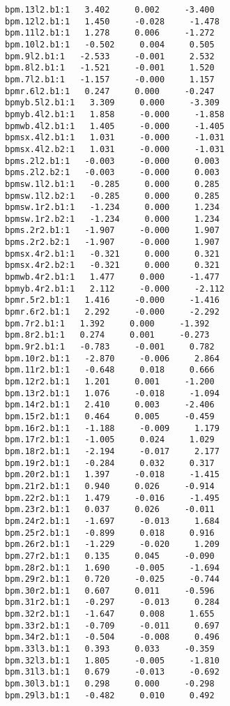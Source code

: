 \begin{verbatim}
bpm.13l2.b1:1   3.402     0.002     -3.400
bpm.12l2.b1:1   1.450     -0.028     -1.478
bpm.11l2.b1:1   1.278     0.006     -1.272
bpm.10l2.b1:1   -0.502     0.004     0.505
bpm.9l2.b1:1   -2.533     -0.001     2.532
bpm.8l2.b1:1   -1.521     -0.001     1.520
bpm.7l2.b1:1   -1.157     -0.000     1.157
bpmr.6l2.b1:1   0.247     0.000     -0.247
bpmyb.5l2.b1:1   3.309     0.000     -3.309
bpmyb.4l2.b1:1   1.858     -0.000     -1.858
bpmwb.4l2.b1:1   1.405     -0.000     -1.405
bpmsx.4l2.b1:1   1.031     -0.000     -1.031
bpmsx.4l2.b2:1   1.031     -0.000     -1.031
bpms.2l2.b1:1   -0.003     -0.000     0.003
bpms.2l2.b2:1   -0.003     -0.000     0.003
bpmsw.1l2.b1:1   -0.285     0.000     0.285
bpmsw.1l2.b2:1   -0.285     0.000     0.285
bpmsw.1r2.b1:1   -1.234     0.000     1.234
bpmsw.1r2.b2:1   -1.234     0.000     1.234
bpms.2r2.b1:1   -1.907     -0.000     1.907
bpms.2r2.b2:1   -1.907     -0.000     1.907
bpmsx.4r2.b1:1   -0.321     0.000     0.321
bpmsx.4r2.b2:1   -0.321     0.000     0.321
bpmwb.4r2.b1:1   1.477     0.000     -1.477
bpmyb.4r2.b1:1   2.112     -0.000     -2.112
bpmr.5r2.b1:1   1.416     -0.000     -1.416
bpmr.6r2.b1:1   2.292     -0.000     -2.292
bpm.7r2.b1:1   1.392     0.000     -1.392
bpm.8r2.b1:1   0.274     0.001     -0.273
bpm.9r2.b1:1   -0.783     -0.001     0.782
bpm.10r2.b1:1   -2.870     -0.006     2.864
bpm.11r2.b1:1   -0.648     0.018     0.666
bpm.12r2.b1:1   1.201     0.001     -1.200
bpm.13r2.b1:1   1.076     -0.018     -1.094
bpm.14r2.b1:1   2.410     0.003     -2.406
bpm.15r2.b1:1   0.464     0.005     -0.459
bpm.16r2.b1:1   -1.188     -0.009     1.179
bpm.17r2.b1:1   -1.005     0.024     1.029
bpm.18r2.b1:1   -2.194     -0.017     2.177
bpm.19r2.b1:1   -0.284     0.032     0.317
bpm.20r2.b1:1   1.397     -0.018     -1.415
bpm.21r2.b1:1   0.940     0.026     -0.914
bpm.22r2.b1:1   1.479     -0.016     -1.495
bpm.23r2.b1:1   0.037     0.026     -0.011
bpm.24r2.b1:1   -1.697     -0.013     1.684
bpm.25r2.b1:1   -0.899     0.018     0.916
bpm.26r2.b1:1   -1.229     -0.020     1.209
bpm.27r2.b1:1   0.135     0.045     -0.090
bpm.28r2.b1:1   1.690     -0.005     -1.694
bpm.29r2.b1:1   0.720     -0.025     -0.744
bpm.30r2.b1:1   0.607     0.011     -0.596
bpm.31r2.b1:1   -0.297     -0.013     0.284
bpm.32r2.b1:1   -1.647     0.008     1.655
bpm.33r2.b1:1   -0.709     -0.011     0.697
bpm.34r2.b1:1   -0.504     -0.008     0.496
bpm.33l3.b1:1   0.393     0.033     -0.359
bpm.32l3.b1:1   1.805     -0.005     -1.810
bpm.31l3.b1:1   0.679     -0.013     -0.692
bpm.30l3.b1:1   0.298     0.000     -0.298
bpm.29l3.b1:1   -0.482     0.010     0.492

\end{verbatim}
